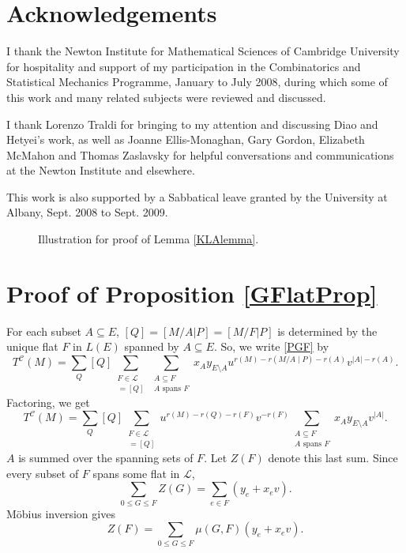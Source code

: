 \documentclass[12pt,leqno]{amsart}
\theoremstyle{remark}
\begin{document}
\section{Acknowledgements}

I thank
the Newton Institute for Mathematical Sciences
of Cambridge University for hospitality and support of my
participation in the Combinatorics and Statistical Mechanics
Programme, January to July 2008, during which some of this
work and many related subjects were reviewed and discussed.

I thank Lorenzo Traldi for bringing to my attention and
discussing Diao and Hetyei's work, as well as
Joanne Ellis-Monaghan, Gary Gordon, Elizabeth McMahon
and Thomas Zaslavsky for helpful conversations and communications
at the Newton Institute and elsewhere.

This work is also supported by a Sabbatical leave granted
by the University at Albany, Sept. 2008 to Sept. 2009.




\appendix

\begin{figure}

\caption{\label{Venn} Illustration for proof of Lemma \ref{KLAlemma}.}
\end{figure}



\section{Proof of Proposition \ref{GFlatProp}}

For each subset $A\subseteq E$, 
$[Q] = [M/A|P] = [M/F|P]$ is determined by the unique flat $F$
in $L(E)$ spanned by $A\subseteq E$.  So, we write \eqref{PGF}
by
\[
T^{\mathcal{C}}(M) = 
     \sum_{Q} [Q] \sum_{\substack{
                     F\in \mathcal{L}\\
                     [M/F|P]=[Q]
                      }}
      \sum_{\substack{
             A\subseteq F\\
             A\text{ spans }F
          }}
      x_A y_{E\setminus A}
      u^{r(M)-r(M/A\mid P)-r(A)}
      v^{|A|-r(A)}.
\]
Factoring, we get
\[
T^{\mathcal{C}}(M) = 
     \sum_{Q} [Q] \sum_{\substack{
                     F\in \mathcal{L}\\
                     [M/F|P]=[Q]
                      }}
      u^{r(M)-r(Q)-r(F)}
      v^{-r(F)}
      \sum_{\substack{
             A\subseteq F\\
             A\text{ spans }F
          }}
      x_A y_{E\setminus A}
      v^{|A|}.
\]
$A$ is summed over the spanning sets of $F$.  Let $Z(F)$ denote
this last sum.  Since every subset of $F$ spans some flat
in $\mathcal{L}$,
\[
\sum_{0\le G \le F}Z(G) = \sum_{e\in F}(y_e + x_ev).
\]
M\"{o}bius inversion gives
\[
Z(F)= \sum_{0\le G\le F}\mu(G,F)(y_e +  x_ev).
\]
\end{document}
